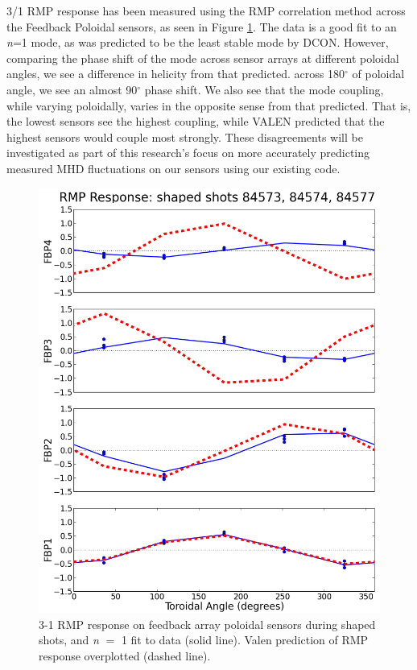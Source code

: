 \documentclass[aps,preprint,showpacs,superscriptaddress,groupedaddress]{revtex4}  %
\begin{document}
3/1 RMP response has been measured using the RMP correlation method across the Feedback Poloidal sensors, as seen in Figure \ref{RMP_response}.  The data is a good fit to an \textit{n}=1 mode, as was predicted to be the least stable mode by DCON.  However, comparing the phase shift of the mode across sensor arrays at different poloidal angles, we see a difference in helicity from that predicted.  across 180$^{\circ}$ of poloidal angle, we see an almost 90$^{\circ}$ phase shift.  We also see that the mode coupling, while varying poloidally, varies in the opposite sense from that predicted.  That is, the lowest sensors see the highest coupling, while VALEN predicted that the highest sensors would couple most strongly.  These disagreements will be investigated as part of this research's focus on more accurately predicting measured MHD fluctuations on our sensors using our existing code.
	
\begin{figure}[htb]
	\centering
\includegraphics[scale=.35]{../Plots/RMP_response_meas_vs_sim.png}\caption{3-1 RMP response on feedback array poloidal sensors during shaped shots, and \textit{n} $=$ 1 fit to data (solid line).  Valen prediction of RMP response overplotted (dashed line).}
	\label{RMP_response}
	\end{figure}
	
\end{document}
